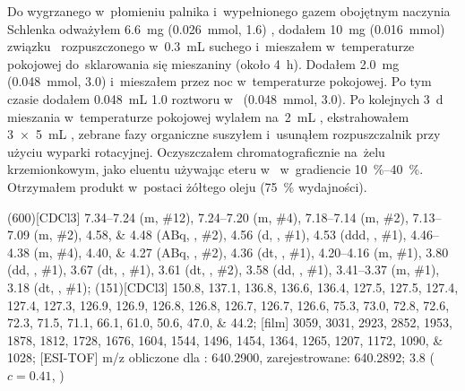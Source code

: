 Do wygrzanego w~płomieniu palnika i~wypełnionego gazem obojętnym naczynia Schlenka odważyłem
  \SI{6.6}{\milli\gram} (\SI{0.026}{\milli\mol}, \SI{1.6}{\equiv}) ,
  dodałem \SI{10}{\milli\gram} (\SI{0.016}{\milli\mol}) związku~
  rozpuszczonego w~\SI{0.3}{\milli\liter} suchego  i~mieszałem w~temperaturze pokojowej
  do~sklarowania się mieszaniny (około \SI{4}{\hour}).
Dodałem \SI{2.0}{\milli\gram} (\SI{0.048}{\milli\mol}, \SI{3.0}{\equiv}) 
  i~mieszałem przez noc w~temperaturze pokojowej.
Po tym czasie dodałem \SI{0.048}{\milli\liter} \SI{1.0}{\Molar} roztworu  w~
  (\SI{0.048}{\milli\mol}, \SI{3.0}{\equiv}).
Po kolejnych \SI{3}{\day} mieszania w~temperaturze pokojowej wylałem na~\SI{2}{\milli\liter} ,
  ekstrahowałem \SI[product-units = single]{3 x 5}{\mL} ,
  zebrane fazy organiczne suszyłem  i~usunąłem rozpuszczalnik przy użyciu wyparki rotacyjnej.
Oczyszczałem chromatograficznie na~żelu krzemionkowym, jako eluentu używając eteru
   w~ w~gradiencie \SIrange{10}{40}{\percent}.
Otrzymałem produkt w~postaci żółtego oleju (\SI{75}{\percent} wydajności).

\begin{fullexp}
  \NMR(600)[CDCl3] \numrange{7.34}{7.24} (m, \#{12}), \numrange{7.24}{7.20} (m, \#{4}), \numrange{7.18}{7.14} (m, \#{2}), \numrange{7.13}{7.09} (m, \#{2}), \numlist{4.58;4.48} (ABq, , \#{2}), \num{4.56} (d, , \#{1}), \num{4.53} (ddd, , \#{1}), \numrange{4.46}{4.38} (m, \#{4}), \numlist{4.40;4.27} (ABq, , \#{2}), \num{4.36} (dt, , \#{1}), \numrange{4.20}{4.16} (m, \#{1}), \num{3.80} (dd, , \#{1}), \num{3.67} (dt, , \#{1}), \num{3.61} (dt, , \#{2}), \num{3.58} (dd, , \#{1}), \numrange{3.41}{3.37} (m, \#{1}), \num{3.18} (dt, , \#{1});
  (151)[CDCl3] \numlist{150.8; 137.1; 136.8; 136.6; 136.4; 127.5; 127.5; 127.4; 127.4; 127.3; 126.9; 126.9; 126.8; 126.8; 126.7; 126.7; 126.6; 75.3; 73.0; 72.8; 72.6; 72.3; 71.5; 71.1; 66.1; 61.0; 50.6; 47.0; 44.2};
  [film] \numlist{3059; 3031; 2923; 2852; 1953; 1878; 1812; 1728; 1676; 1604; 1544; 1496; 1454; 1364; 1265; 1207; 1172; 1090; 1028};
  [ESI-TOF] m/z obliczone dla : \num{640.2900}, zarejestrowane: \num{640.2892};
  \data{[$\alpha^{23}_D$]~$=$} \num{3.8} ($c = 0.41$, )
\end{fullexp}

